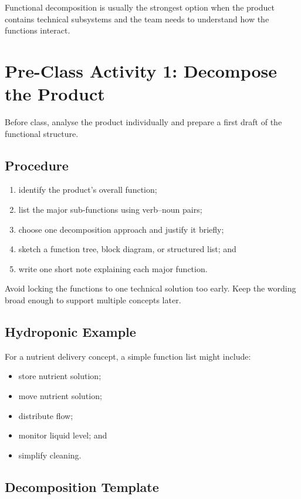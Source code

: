 Functional decomposition is usually the strongest option when the product contains technical subsystems and the team needs to understand how the functions interact.

\section{Pre-Class Activity 1: Decompose the Product}

Before class, analyse the product individually and prepare a first draft of the functional structure.

\subsection{Procedure}
\begin{enumerate}
    \item identify the product's overall function;
    \item list the major sub-functions using verb--noun pairs;
    \item choose one decomposition approach and justify it briefly;
    \item sketch a function tree, block diagram, or structured list; and
    \item write one short note explaining each major function.
\end{enumerate}

Avoid locking the functions to one technical solution too early. Keep the wording broad enough to support multiple concepts later.

\subsection{Hydroponic Example}

For a nutrient delivery concept, a simple function list might include:
\begin{itemize}
    \item store nutrient solution;
    \item move nutrient solution;
    \item distribute flow;
    \item monitor liquid level; and
    \item simplify cleaning.
\end{itemize}

\subsection{Decomposition Template}

